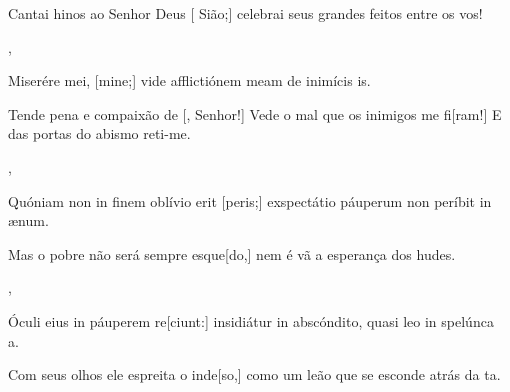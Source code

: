 {        {\item {}Cantai hinos ao Senhor Deus [ Sião;] celebrai seus grandes feitos entre os vos!~\Responsorium},
    {\item {}Miserére mei, [mine;] vide afflictiónem meam de inimícis is.~\Responsorium}%
        {\item {}Tende pena e compaixão de [, Senhor!] Vede o mal que os inimigos me fi[ram!] E das portas do abismo reti-me.~\Responsorium},
    {\item {}Quóniam non in finem oblívio erit [peris;] exspectátio páuperum non períbit in ænum.~\Responsorium}%
        {\item {}Mas o pobre não será sempre esque[do,] nem é vã a esperança dos hudes.~\Responsorium},
    {\item {}Óculi eius in páuperem re[ciunt:] insidiátur in abscóndito, quasi leo in spelúnca a.~\Responsorium}%
        {\item {}Com seus olhos ele espreita o inde[so,] como um leão que se esconde atrás da ta.~\Responsorium}
}